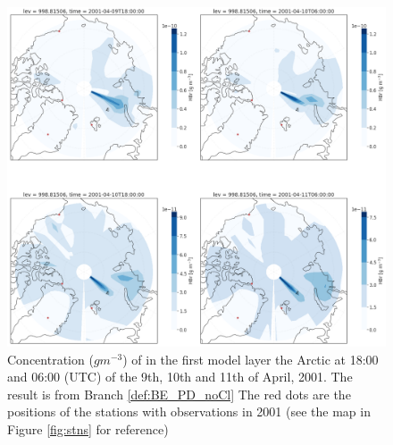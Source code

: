 \begin{figure}[h]
    \centering
    \includegraphics[width = \linewidth]{Chapter6_Results/images/polarHBr_noCl.png}
    \caption{Concentration ($g m^{-3}$) of  in the first model layer the Arctic at 18:00 and 06:00 (UTC) of the 9th, 10th and 11th of April, 2001. The result is from Branch \ref{def:BE_PD_noCl} The red dots are the positions of the stations with observations in 2001 (see the map in Figure \ref{fig:stns} for reference)}
    \label{fig:polarHBr_noCl}
\end{figure}